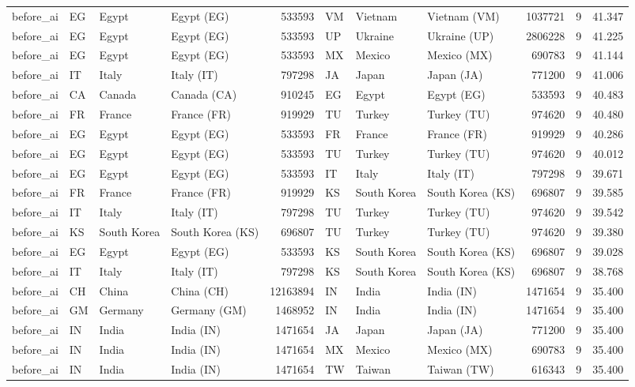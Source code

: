 \begin{tabular}{llllrlllrrr}
before\_ai & EG & Egypt & Egypt (EG) & 533593 & VM & Vietnam & Vietnam (VM) & 1037721 & 9 & 41.347 \\
before\_ai & EG & Egypt & Egypt (EG) & 533593 & UP & Ukraine & Ukraine (UP) & 2806228 & 9 & 41.225 \\
before\_ai & EG & Egypt & Egypt (EG) & 533593 & MX & Mexico & Mexico (MX) & 690783 & 9 & 41.144 \\
before\_ai & IT & Italy & Italy (IT) & 797298 & JA & Japan & Japan (JA) & 771200 & 9 & 41.006 \\
before\_ai & CA & Canada & Canada (CA) & 910245 & EG & Egypt & Egypt (EG) & 533593 & 9 & 40.483 \\
before\_ai & FR & France & France (FR) & 919929 & TU & Turkey & Turkey (TU) & 974620 & 9 & 40.480 \\
before\_ai & EG & Egypt & Egypt (EG) & 533593 & FR & France & France (FR) & 919929 & 9 & 40.286 \\
before\_ai & EG & Egypt & Egypt (EG) & 533593 & TU & Turkey & Turkey (TU) & 974620 & 9 & 40.012 \\
before\_ai & EG & Egypt & Egypt (EG) & 533593 & IT & Italy & Italy (IT) & 797298 & 9 & 39.671 \\
before\_ai & FR & France & France (FR) & 919929 & KS & South Korea & South Korea (KS) & 696807 & 9 & 39.585 \\
before\_ai & IT & Italy & Italy (IT) & 797298 & TU & Turkey & Turkey (TU) & 974620 & 9 & 39.542 \\
before\_ai & KS & South Korea & South Korea (KS) & 696807 & TU & Turkey & Turkey (TU) & 974620 & 9 & 39.380 \\
before\_ai & EG & Egypt & Egypt (EG) & 533593 & KS & South Korea & South Korea (KS) & 696807 & 9 & 39.028 \\
before\_ai & IT & Italy & Italy (IT) & 797298 & KS & South Korea & South Korea (KS) & 696807 & 9 & 38.768 \\
before\_ai & CH & China & China (CH) & 12163894 & IN & India & India (IN) & 1471654 & 9 & 35.400 \\
before\_ai & GM & Germany & Germany (GM) & 1468952 & IN & India & India (IN) & 1471654 & 9 & 35.400 \\
before\_ai & IN & India & India (IN) & 1471654 & JA & Japan & Japan (JA) & 771200 & 9 & 35.400 \\
before\_ai & IN & India & India (IN) & 1471654 & MX & Mexico & Mexico (MX) & 690783 & 9 & 35.400 \\
before\_ai & IN & India & India (IN) & 1471654 & TW & Taiwan & Taiwan (TW) & 616343 & 9 & 35.400 \\

\end{tabular}
